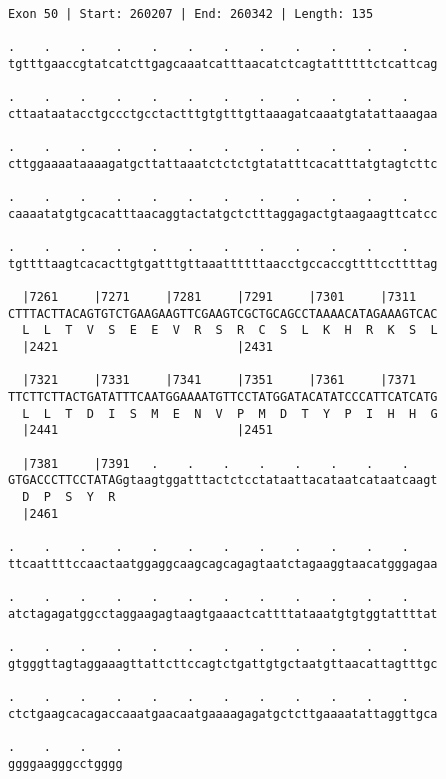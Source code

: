 \documentclass{article}
\begin{document}
\begin{Verbatim}
Exon 50 | Start: 260207 | End: 260342 | Length: 135
 
.    .    .    .    .    .    .    .    .    .    .    .    
tgtttgaaccgtatcatcttgagcaaatcatttaacatctcagtattttttctcattcag
  
.    .    .    .    .    .    .    .    .    .    .    .    
cttaataatacctgccctgcctactttgtgtttgttaaagatcaaatgtatattaaagaa
  
.    .    .    .    .    .    .    .    .    .    .    .    
cttggaaaataaaagatgcttattaaatctctctgtatatttcacatttatgtagtcttc
  
.    .    .    .    .    .    .    .    .    .    .    .    
caaaatatgtgcacatttaacaggtactatgctctttaggagactgtaagaagttcatcc
  
.    .    .    .    .    .    .    .    .    .    .    .    
tgttttaagtcacacttgtgatttgttaaattttttaacctgccaccgttttccttttag
  
  |7261     |7271     |7281     |7291     |7301     |7311   
CTTTACTTACAGTGTCTGAAGAAGTTCGAAGTCGCTGCAGCCTAAAACATAGAAAGTCAC
  L  L  T  V  S  E  E  V  R  S  R  C  S  L  K  H  R  K  S  L
  |2421                         |2431                       
  
  |7321     |7331     |7341     |7351     |7361     |7371   
TTCTTCTTACTGATATTTCAATGGAAAATGTTCCTATGGATACATATCCCATTCATCATG
  L  L  T  D  I  S  M  E  N  V  P  M  D  T  Y  P  I  H  H  G
  |2441                         |2451                       
  
  |7381     |7391   .    .    .    .    .    .    .    .    
GTGACCCTTCCTATAGgtaagtggatttactctcctataattacataatcataatcaagt
  D  P  S  Y  R                                             
  |2461                                                     
  
.    .    .    .    .    .    .    .    .    .    .    .    
ttcaattttccaactaatggaggcaagcagcagagtaatctagaaggtaacatgggagaa
  
.    .    .    .    .    .    .    .    .    .    .    .    
atctagagatggcctaggaagagtaagtgaaactcattttataaatgtgtggtattttat
  
.    .    .    .    .    .    .    .    .    .    .    .    
gtgggttagtaggaaagttattcttccagtctgattgtgctaatgttaacattagtttgc
  
.    .    .    .    .    .    .    .    .    .    .    .    
ctctgaagcacagaccaaatgaacaatgaaaagagatgctcttgaaaatattaggttgca
  
.    .    .    .
ggggaagggcctgggg
\end{Verbatim}
\newpage
\end{document}

